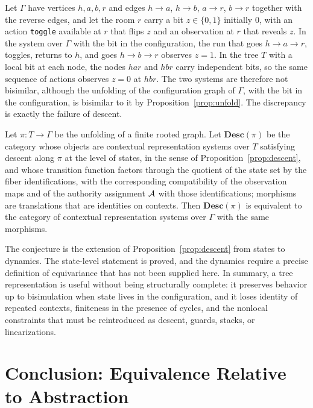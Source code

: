 \begin{example}\label{ex:sharedroom}
Let $\Gamma$ have vertices $h,a,b,r$ and edges $h\to a$, $h\to b$, $a\to r$, $b\to r$ together with the reverse edges, and let the room $r$ carry a bit $z\in\{0,1\}$ initially $0$, with an action \texttt{toggle} available at $r$ that flips $z$ and an observation at $r$ that reveals $z$. In the system over $\Gamma$ with the bit in the configuration, the run that goes $h\to a\to r$, toggles, returns to $h$, and goes $h\to b\to r$ observes $z=1$. In the tree $T$ with a local bit at each node, the nodes $har$ and $hbr$ carry independent bits, so the same sequence of actions observes $z=0$ at $hbr$. The two systems are therefore not bisimilar, although the unfolding of the configuration graph of $\Gamma$, with the bit in the configuration, is bisimilar to it by Proposition~\ref{prop:unfold}. The discrepancy is exactly the failure of descent.
\end{example}

\begin{conjecture}\label{conj:descent}
Let $\pi:T\to\Gamma$ be the unfolding of a finite rooted graph. Let $\mathbf{Desc}(\pi)$ be the category whose objects are contextual representation systems over $T$ satisfying descent along $\pi$ at the level of states, in the sense of Proposition~\ref{prop:descent}, and whose transition function factors through the quotient of the state set by the fiber identifications, with the corresponding compatibility of the observation maps and of the authority assignment $\mathcal A$ with those identifications; morphisms are translations that are identities on contexts. Then $\mathbf{Desc}(\pi)$ is equivalent to the category of contextual representation systems over $\Gamma$ with the same morphisms.
\end{conjecture}

The conjecture is the extension of Proposition~\ref{prop:descent} from states to dynamics. The state-level statement is proved, and the dynamics require a precise definition of equivariance that has not been supplied here. In summary, a tree representation is useful without being structurally complete: it preserves behavior up to bisimulation when state lives in the configuration, and it loses identity of repeated contexts, finiteness in the presence of cycles, and the nonlocal constraints that must be reintroduced as descent, guards, stacks, or linearizations.

\section{Conclusion: Equivalence Relative to Abstraction}

